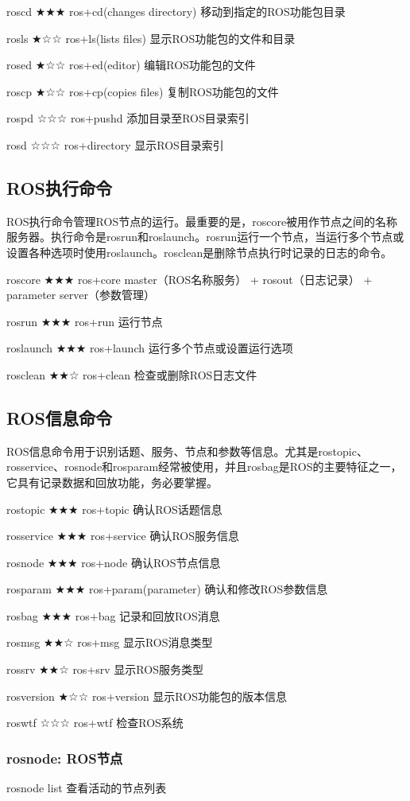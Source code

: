\documentclass[geye,green,kindle,cn]{elegantnote}
\begin{document}
roscd ★★★ ros+cd(changes directory) 移动到指定的ROS功能包目录

rosls ★☆☆ ros+ls(lists files) 显示ROS功能包的文件和目录

rosed ★☆☆ ros+ed(editor) 编辑ROS功能包的文件

roscp ★☆☆ ros+cp(copies files) 复制ROS功能包的文件

rospd ☆☆☆ ros+pushd 添加目录至ROS目录索引

rosd ☆☆☆ ros+directory 显示ROS目录索引 
\subsection{ROS执行命令}
ROS执行命令管理ROS节点的运行。最重要的是，roscore被用作节点之间的名称服务器。执行命令是rosrun和roslaunch。rosrun运行一个节点，当运行多个节点或设置各种选项时使用roslaunch。rosclean是删除节点执行时记录的日志的命令。

roscore ★★★ ros+core master（ROS名称服务） + rosout（日志记录） + parameter server（参数管理） 

rosrun ★★★ ros+run 运行节点 

roslaunch ★★★ ros+launch 运行多个节点或设置运行选项 

rosclean ★★☆ ros+clean 检查或删除ROS日志文件 
\subsection{ROS信息命令}
ROS信息命令用于识别话题、服务、节点和参数等信息。尤其是rostopic、 rosservice、rosnode和rosparam经常被使用，并且rosbag是ROS的主要特征之一，它具有记录数据和回放功能，务必要掌握。

rostopic ★★★ ros+topic 确认ROS话题信息 

rosservice ★★★ ros+service 确认ROS服务信息 

rosnode ★★★ ros+node 确认ROS节点信息 

rosparam ★★★ ros+param(parameter) 确认和修改ROS参数信息 

rosbag ★★★ ros+bag 记录和回放ROS消息 

rosmsg ★★☆ ros+msg 显示ROS消息类型 

rossrv ★★☆ ros+srv 显示ROS服务类型 

rosversion ★☆☆ ros+version 显示ROS功能包的版本信息 

roswtf ☆☆☆ ros+wtf 检查ROS系统
\subsubsection{rosnode: ROS节点}
rosnode list 查看活动的节点列表 
\end{document}
